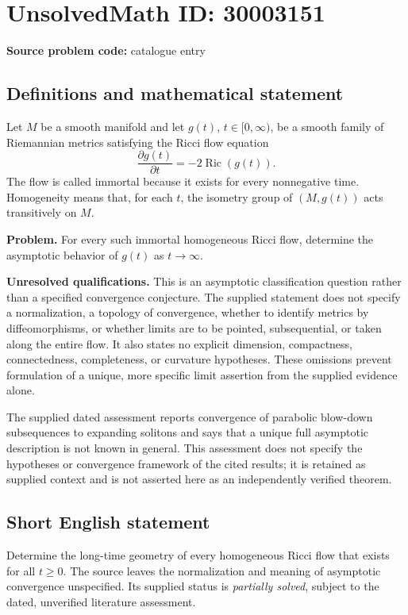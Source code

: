 \documentclass[11pt]{article}
\begin{document}
\section*{UnsolvedMath ID: 30003151}
\textbf{Source problem code:} catalogue entry
\subsection{Definitions and mathematical statement}
Let \(M\) be a smooth manifold and let \(g(t)\), \(t\in[0,\infty)\), be a smooth family of Riemannian metrics satisfying the Ricci flow equation
\[
\frac{\partial g(t)}{\partial t}=-2\operatorname{Ric}(g(t)).
\]
The flow is called immortal because it exists for every nonnegative time. Homogeneity means that, for each \(t\), the isometry group of \((M,g(t))\) acts transitively on \(M\).

\textbf{Problem.} For every such immortal homogeneous Ricci flow, determine the asymptotic behavior of \(g(t)\) as \(t\to\infty\).

\textbf{Unresolved qualifications.} This is an asymptotic classification question rather than a specified convergence conjecture. The supplied statement does not specify a normalization, a topology of convergence, whether to identify metrics by diffeomorphisms, or whether limits are to be pointed, subsequential, or taken along the entire flow. It also states no explicit dimension, compactness, connectedness, completeness, or curvature hypotheses. These omissions prevent formulation of a unique, more specific limit assertion from the supplied evidence alone.

The supplied dated assessment reports convergence of parabolic blow-down subsequences to expanding solitons and says that a unique full asymptotic description is not known in general. This assessment does not specify the hypotheses or convergence framework of the cited results; it is retained as supplied context and is not asserted here as an independently verified theorem.
\subsection{Short English statement}
Determine the long-time geometry of every homogeneous Ricci flow that exists for all \(t\geq0\). The source leaves the normalization and meaning of asymptotic convergence unspecified. Its supplied status is \emph{partially solved}, subject to the dated, unverified literature assessment.
\end{document}
